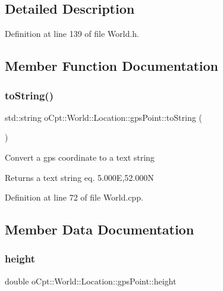 \subsection{Detailed Description}


Definition at line 139 of file World.\+h.



\subsection{Member Function Documentation}
\hypertarget{structo_cpt_1_1_world_1_1_location_1_1gps_point_a6274bfccaa6be97f2146ab7805ada0af}{}\label{structo_cpt_1_1_world_1_1_location_1_1gps_point_a6274bfccaa6be97f2146ab7805ada0af} 
\subsubsection{\texorpdfstring{to\+String()}{toString()}}
{\footnotesize\ttfamily std\+::string o\+Cpt\+::\+World\+::\+Location\+::gps\+Point\+::to\+String (\begin{DoxyParamCaption}{ }\end{DoxyParamCaption})}

Convert a gps coordinate to a text string \begin{DoxyReturn}{Returns}
a text string eq. 5.\+000E,52.\+000N 
\end{DoxyReturn}


Definition at line 72 of file World.\+cpp.



\subsection{Member Data Documentation}
\hypertarget{structo_cpt_1_1_world_1_1_location_1_1gps_point_a94635e1477d9136f9cbb54fa8fa1fa39}{}\label{structo_cpt_1_1_world_1_1_location_1_1gps_point_a94635e1477d9136f9cbb54fa8fa1fa39} 
\subsubsection{\texorpdfstring{height}{height}}
{\footnotesize\ttfamily double o\+Cpt\+::\+World\+::\+Location\+::gps\+Point\+::height}



